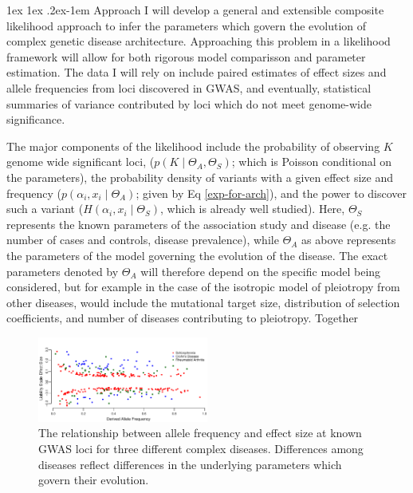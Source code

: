\documentclass[11pt]{article}
\makeatletter
\renewcommand{\paragraph}{%
  \@startsection{paragraph}{4}%
  {\z@}{1ex \@plus 1ex \@minus .2ex}{-1em}%
  {\normalfont\normalsize\bfseries}%
}
\makeatother
\begin{document}
\paragraph{Approach}
I will develop a general and extensible composite likelihood approach to infer the parameters which govern the evolution of complex genetic disease architecture. Approaching this problem in a likelihood framework will allow for both rigorous model comparisson and parameter estimation\cite{Larribe:2011jb,Coffman:2015by}. The data I will rely on include paired estimates of effect sizes and allele frequencies from loci discovered in GWAS, and eventually, statistical summaries of variance contributed by loci which do not meet genome-wide significance.

The major components of the likelihood include the probability of observing $K$ genome wide significant loci, ($p\left(K \mid \Theta_A , \Theta_S \right)$; which is Poisson conditional on the parameters), the probability density of variants with a given effect size and frequency ($p\left(\alpha_i , x_i \mid \Theta_A \right)$; given by Eq \eqref{exp-for-arch}), and the power to discover such a variant ($H\left(\alpha_i , x_i \mid \Theta_S\right)$, which is already well studied\cite{Sham:2014di}). Here, $\Theta_S$ represents the known parameters of the association study and disease (e.g. the number of cases and controls, disease prevalence), while $\Theta_A$ as above represents the parameters of the model governing the evolution of the disease. The exact parameters denoted by $\Theta_A$ will therefore depend on the specific model being considered, but for example in the case of the isotropic model of pleiotropy from other diseases, would include the mutational target size, distribution of selection coefficients, and number of diseases contributing to pleiotropy. Together 

\begin{figure}
    \includegraphics[width=0.5\textwidth]{../figures/JointSpecFig.pdf}
   \caption{The relationship between allele frequency and effect size at known GWAS loci for three different complex diseases. Differences among diseases reflect differences in the underlying parameters which govern their evolution.}
   \label{joint-freq-effect-dist}
 \end{figure}
\end{document}
